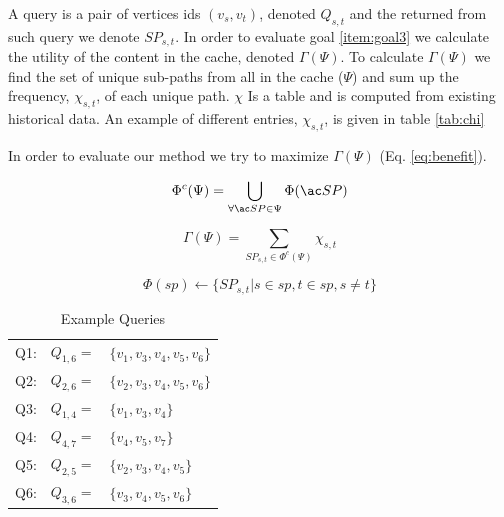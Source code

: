 A query is a pair of vertices ids $(v_s, v_t)$, denoted $Q_{s,t}$ and the \spath returned from such query we denote $SP_{s,t}$. 
In order to evaluate goal \ref{item:goal3} we calculate the utility of the content in the cache, denoted $\Gamma(\Psi)$. To calculate $\Gamma(\Psi)$ we find the set of unique sub-paths from all \spaths in the cache ($\Psi$) and sum up the frequency, $\chi_{s,t}$, of each unique path.
$\chi$ Is a table and is computed from existing historical data. An example of different entries, $\chi_{s,t}$, is given in table \ref{tab:chi}

In order to evaluate our method we try to maximize $\Gamma(\Psi)$ (Eq. \ref{eq:benefit}).



\begin{equation} \label{eq:upsi}
 \Phi^c(\Psi) = \bigcup\limits_{\forall \spath \in \Psi} \Phi(\spath)
\end{equation}

\begin{equation} \label{eq:benefit}
\Gamma(\Psi) = \sum\limits_{SP_{s,t} \in \Phi^c(\Psi)} \chi_{s,t}
\end{equation}

\begin{equation} \label{eq:phi}
\Phi(sp) \leftarrow \{ SP_{s,t} | s \in sp, t \in sp, s \neq t\}
\end{equation}


\begin{table}
\begin{tabular}{l l p{}}
Q1:	&	$Q_{1,6} =$ 	& $\{v_1,v_3,v_4,v_5,v_6\}$\\
Q2:	&	$Q_{2,6} =$ 	& $\{v_2,v_3,v_4,v_5,v_6\}$ \\
Q3:	&	$Q_{1,4} =$ 	& $\{v_1,v_3,v_4\}$ \\
Q4:	&	$Q_{4,7} =$ 	& $\{v_4,v_5,v_7\}$ \\
Q5:	&	$Q_{2,5} =$ 	& $\{v_2,v_3,v_4,v_5\}$ \\
Q6:	&	$Q_{3,6} =$ 	& $\{v_3,v_4,v_5,v_6\}$ \\
\end{tabular}
\caption{Example Queries}
\label{tab:queries}
\end{table}

